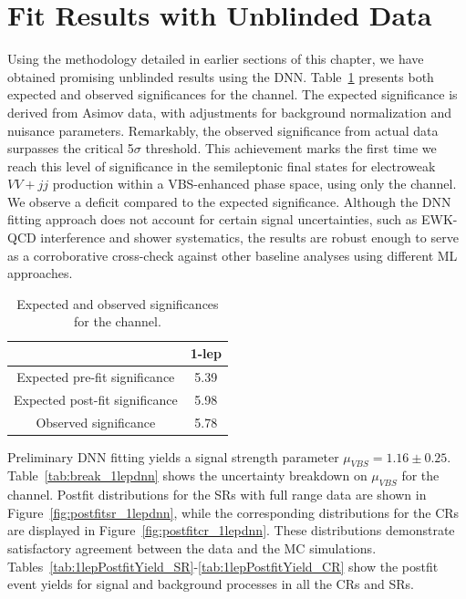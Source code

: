 \clearpage
\section{Fit Results with Unblinded Data}
\label{sec:Fit_Results_ub}

Using the methodology detailed in earlier sections of this chapter, we have obtained promising unblinded results using the DNN. 
Table~\ref{tab:significance_1lepdnn} presents both expected and observed significances for the \olep channel. The expected significance is derived from Asimov data, with adjustments for background normalization and nuisance parameters. 
Remarkably, the observed significance from actual data surpasses the critical 5$\sigma$ threshold. This achievement marks the first time we reach this level of significance in the semileptonic final states for electroweak $VV+jj$ production within a VBS-enhanced phase space, using only the \olep channel.
We observe a deficit compared to the expected significance. Although the DNN fitting approach does not account for certain signal uncertainties, such as EWK-QCD interference and shower systematics, the results are robust enough to serve as a corroborative cross-check against other baseline analyses using different ML approaches.


\begin{table}[h]
  \centering
  \begin{tabular}{|c|c|}
    \hline
           & 1-lep \\
    \hline
    Expected pre-fit significance & 5.39 \\
    \hline
    Expected post-fit significance & 5.98 \\
    \hline
    Observed significance & 5.78 \\
    \hline
  \end{tabular}
  \caption{Expected and observed significances for the \olep channel.}
  \label{tab:significance_1lepdnn}
\end{table}

Preliminary DNN fitting yields a signal strength parameter $\mu_{VBS} = 1.16 \pm 0.25$. 
Table~\ref{tab:break_1lepdnn} shows the uncertainty breakdown on $\mu_{VBS}$ for the \olep channel.
Postfit distributions for the SRs with full range data are shown in Figure~\ref{fig:postfitsr_1lepdnn}, while the corresponding distributions for the CRs are displayed in Figure~\ref{fig:postfitcr_1lepdnn}. These distributions demonstrate satisfactory agreement between the data and the MC simulations.
Tables~\ref{tab:1lepPostfitYield_SR}-\ref{tab:1lepPostfitYield_CR} show the postfit event yields for signal and background processes in all the CRs and SRs.

